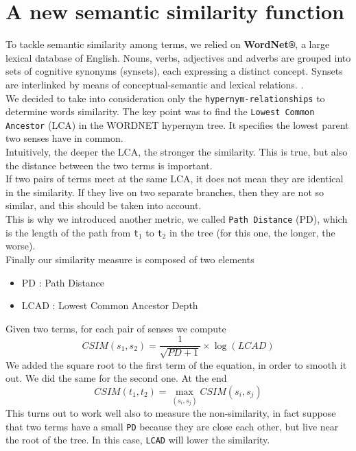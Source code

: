 \documentclass[letterpaper, 10 pt, conference]{ieeeconf}  %
\begin{document}
\section{A new semantic similarity function}
To tackle semantic similarity among terms, we relied on \textbf{WordNet®}\cite{c5}, a large lexical database of English. Nouns, verbs, adjectives and adverbs are grouped into sets of cognitive synonyms (synsets), each expressing a distinct concept. Synsets are interlinked by means of conceptual-semantic and lexical relations.
.\\
We decided to take into consideration only the \texttt{hypernym-relationships} to determine words similarity. The key point was to find the \texttt{Lowest Common Ancestor} (LCA) in the WORDNET hypernym tree. It specifies the lowest parent two senses have in common.\\
Intuitively, the deeper the LCA, the stronger the similarity. This is true, but also the distance between the two terms is important.\\
If two pairs of terms meet at the same LCA, it does not mean they are identical in the similarity. If they live on two separate branches, then they are not so similar, and this should be taken into account.\\
This is why we introduced another metric, we called \texttt{Path Distance} (PD), which is the length of the path from \texttt{t$_1$} to \texttt{t$_2$} in the tree (for this one, the longer, the worse).\\
Finally our similarity measure is composed of two elements
\begin{itemize}
\item PD : Path Distance
\item LCAD : Lowest Common Ancestor Depth
\end{itemize}
Given two terms, for each pair of senses we compute
\begin{equation}
CSIM(s_1,s_2) = \frac{1}{\sqrt{PD+1}} \times \log(LCAD)
\end{equation}
We added the square root to the first term of the equation, in order to smooth it out. We did the same for the second one.
At the end
\begin{equation}
CSIM(t_1,t_2) = \max_{(s_i,s_j)} CSIM(s_i,s_j)
\end{equation}
This turns out to work well also to measure the non-similarity, in fact suppose that two terms have a small \texttt{PD} because they are close each other, but live near the root of the tree. In this case, \texttt{LCAD} will lower the similarity.\\
\end{document}
